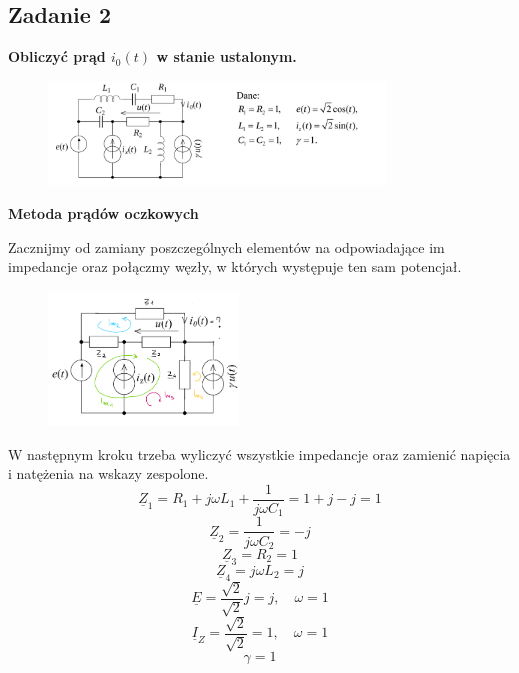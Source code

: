 \documentclass[12pt, a4paper]{article}
\begin{document}
\subsection{Zadanie 2}
\textbf{Obliczyć prąd $i_0(t)$ w stanie ustalonym.}
\begin{figure}[H]
  \includegraphics[width = 0.8\textwidth]{./images/Lista_3/Zadanie_2.png}
\end{figure}
\begin{flushleft}
  \textbf{Metoda prądów oczkowych}
\end{flushleft}

Zacznijmy od zamiany poszczególnych elementów na odpowiadające im impedancje oraz
połączmy węzły, w których występuje ten sam potencjał.
\begin{figure}[H]
  \centering
  \includegraphics[width = 0.45\textwidth]{./images/Lista_3/3.2.3_MPO.png}
\end{figure}
\noindent
W następnym kroku trzeba wyliczyć wszystkie impedancje oraz zamienić napięcia
i natężenia na wskazy zespolone.
\begin{equation*}
  \underline{Z}_1 = R_1 + j\omega L_1 + \frac{1}{j\omega C_1} = 1+j-j=1
\end{equation*}
\begin{equation*}
  \underline{Z}_2 = \frac{1}{j\omega C_2} = -j
\end{equation*}
\begin{equation*}
  \underline{Z}_3 = R_2=1
\end{equation*}
\begin{equation*}
  \underline{Z}_4 = j\omega L_2 = j
\end{equation*}
\begin{equation*}
  \underline{E} = \frac{\sqrt{2}}{\sqrt{2}}j = j, \quad \omega = 1
\end{equation*}
\begin{equation*}
  \underline{I}_Z = \frac{\sqrt{2}}{\sqrt{2}} = 1, \quad \omega = 1
\end{equation*}
\begin{equation*}
  \gamma = 1
\end{equation*}
\end{document}
